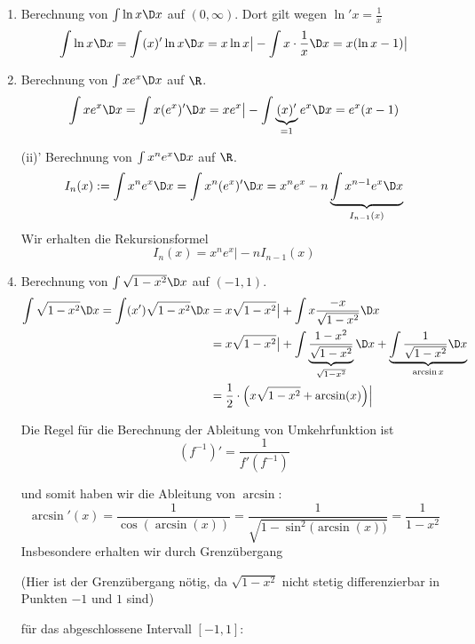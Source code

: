 \begin{example}
\begin{example}
\begin{enumerate}
	\item Berechnung von $\int \ln x \D x$ auf $(0,\infty)$. Dort gilt wegen $\ln' x = \frac{1}{x}$
	\begin{equation*}
		\int \ln x \D x = \int (x)'\ln x \D x = x\ln x \big\vert - \int x \cdot \frac{1}{x} \D x = x (\ln x -1)\big\vert
	\end{equation*}
	\item Berechnung von $\int x e^x \D x$ auf $\R$.
	\begin{equation*}
		\int x e^x \D x = \int x (e^x)' \D x = x e^x\big\vert - \int \underbrace{(x)'}_{=1} e^x \D x =e^x (x-1)
	\end{equation*}
	\item[(ii)'] Berechnung von $\int x^n e^x \D x$ auf $\R$.
	\begin{equation*}
		I_n(x) := \int x^n e^x \D x  = \int x^n (e^x)' \D x = x^ne^x - n \underbrace{\int x^{n-1} e^x \D x}_{I_{n-1}(x)}
	\end{equation*}
	Wir erhalten die Rekursionsformel 
	$$I_n (x) = x^n e^x \big\vert - n I_{n-1}(x)$$
	\item Berechnung von $\int\sqrt{1-x^2}\D x $ auf $(-1,1)$.
	\begin{equation*}
	\begin{split}
		\int \sqrt{1-x^2} \D x= \int (x') \sqrt{1-x^2} \D x & = x \sqrt{1-x^2} \big\vert + \int x  \frac{-x}{\sqrt{1-x^2}} \D x \\
		& = x \sqrt{1-x^2}\big\vert + \int \underbrace{\frac{1-x^2}{\sqrt{1-x^2}}}_{\sqrt{1-x^2}}\D x + \underbrace{\int \frac{1}{\sqrt{1-x^2}} \D x}_{\arcsin x} \\
		& = \frac{1}{2}\cdot \Big( x \sqrt{1-x^2} + \arcsin (x) \Big) \Big\vert
	\end{split}
	\end{equation*}
	\begin{remark}
	Die Regel für die Berechnung der Ableitung von Umkehrfunktion ist
	$$ (f^{-1})' = \frac{1}{f'(f^{-1})} $$
	\end{remark}
	und somit haben wir die Ableitung von $\arcsin$:
	$$\arcsin' (x) = \frac{1}{\cos (\arcsin (x))} = \frac{1}{\sqrt{1-\sin^2\big(\arcsin(x)\big)}} = \frac{1}{1-x^2}$$
	Insbesondere erhalten wir durch Grenzübergang \begin{small} (Hier ist der Grenzübergang nötig, da $\sqrt{1-x^2}$ nicht stetig differenzierbar in Punkten $-1$ und $1$ sind) \end{small} für das abgeschlossene Intervall $[-1,1]$:

\end{enumerate}
\end{example}
\end{example}
